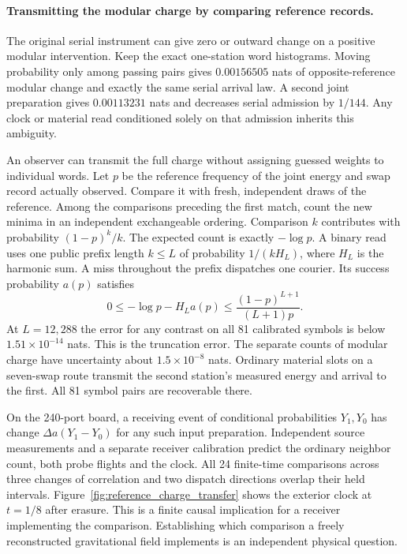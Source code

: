 \documentclass[11pt]{article}
\begin{document}
\paragraph{Transmitting the modular charge by comparing reference records.}
The original serial instrument can give zero or outward change on a
positive modular intervention. Keep the exact one-station word histograms.
Moving probability only among passing pairs gives $0.00156505$ nats of
opposite-reference modular change and exactly the same serial arrival
law. A second joint preparation gives $0.00113231$ nats and decreases
serial admission by $1/144$. Any clock or material read conditioned
solely on that admission inherits this ambiguity.

An observer can transmit the full charge without assigning guessed
weights to individual words. Let $p$ be the reference frequency of the
joint energy and swap record actually observed. Compare it with fresh,
independent draws of the reference. Among the comparisons preceding the
first match, count the new minima in an independent exchangeable
ordering. Comparison $k$ contributes with probability $(1-p)^k/k$.
The expected count is exactly $-\log p$. A binary read uses one
public prefix length $k\le L$ of probability $1/(kH_L)$, where $H_L$
is the harmonic sum. A miss throughout the prefix dispatches one
courier. Its success probability $a(p)$ satisfies
\[
 0\le -\log p-H_La(p)\le
 \frac{(1-p)^{L+1}}{(L+1)p}.
\]
At $L=12{,}288$ the error for any contrast on all 81 calibrated symbols
is below $1.51\times10^{-14}$ nats. This is the truncation error.
The separate counts of modular charge have uncertainty about
$1.5\times10^{-8}$ nats. Ordinary material slots on a seven-swap route
transmit the second station's measured energy and arrival to the first.
All 81 symbol pairs are recoverable there.

On the 240-port board, a receiving event of conditional probabilities
$Y_1,Y_0$ has change $\Delta a(Y_1-Y_0)$ for any such input preparation.
Independent source measurements and a separate receiver calibration
predict the ordinary neighbor count, both probe flights and
the clock. All 24 finite-time comparisons across three changes of
correlation and two dispatch directions overlap their held intervals.
Figure~\ref{fig:reference_charge_transfer} shows the exterior clock
at $t=1/8$ after erasure. This is a finite causal implication for a
receiver implementing the comparison. Establishing which comparison
a freely reconstructed gravitational field implements is an independent
physical question.
\end{document}

